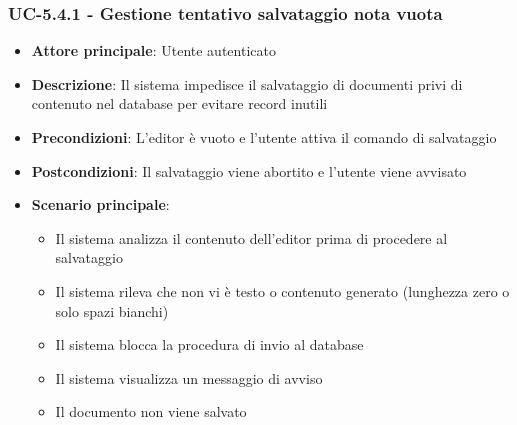 \documentclass[11pt,a4paper]{article}
\begin{document}
\subsubsection{UC-5.4.1 - Gestione tentativo salvataggio nota vuota}
\begin{itemize}
    \item \textbf{Attore principale}: Utente autenticato
    \item \textbf{Descrizione}: Il sistema impedisce il salvataggio di documenti privi di contenuto nel database per evitare record inutili
    \item \textbf{Precondizioni}: L’editor è vuoto e l'utente attiva il comando di salvataggio
    \item \textbf{Postcondizioni}: Il salvataggio viene abortito e l'utente viene avvisato
    \item \textbf{Scenario principale}:
    \begin{itemize}
        \item Il sistema analizza il contenuto dell'editor prima di procedere al salvataggio
        \item Il sistema rileva che non vi è testo o contenuto generato (lunghezza zero o solo spazi bianchi)
        \item Il sistema blocca la procedura di invio al database
        \item Il sistema visualizza un messaggio di avviso
        \item Il documento non viene salvato
    \end{itemize}
\end{itemize}
\end{document}

